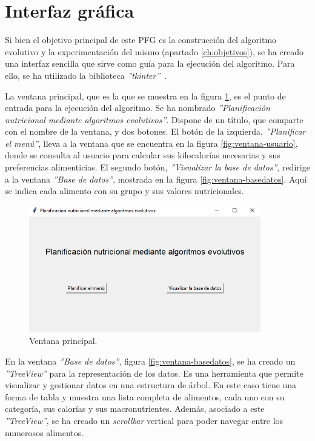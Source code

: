 \section{Interfaz gráfica}
\label{ch:interfaz-grafica}

Si bien el objetivo principal de este PFG es la construcción del algoritmo evolutivo y la experimentación del mismo (apartado \ref{ch:objetivos}), se ha creado una interfaz sencilla que sirve como guía para la ejecución del algoritmo. Para ello, se ha utilizado la biblioteca \textit{''tkinter''}~\cite{python_tkinter}.

La ventana principal, que es la que se muestra en la figura \ref{fig:ventana-main}, es el punto de entrada para la ejecución del algoritmo. Se ha nombrado \textit{''Planificación nutricional mediante algoritmos evolutivos''}. Dispone de un título, que comparte con el nombre de la ventana, y dos botones. El botón de la izquierda, \textit{''Planificar el menú''}, lleva a la ventana que se encuentra en la figura \ref{fig:ventana-usuario}, donde se consulta al usuario para calcular sus kilocalorías necesarias y sus preferencias alimenticias. El segundo botón, \textit{''Visualizar la base de datos''}, redirige a la ventana \textit{''Base de datos''}, mostrada en la figura \ref{fig:ventana-basedatos}. Aquí se indica cada alimento con su grupo y sus valores nutricionales.

\begin{figure}[H]
    \centering
    \includegraphics[width=0.9\textwidth]{figures/ventana-main.png}
    \caption{Ventana principal.}
    \label{fig:ventana-main}
\end{figure}

En la ventana \textit{''Base de datos''}, figura \ref{fig:ventana-basedatos}, se ha creado un \textit{''TreeView''} para la representación de los datos. Es una herramienta que permite visualizar y gestionar datos en una estructura de árbol. En este caso tiene una forma de tabla y muestra una lista completa de alimentos, cada uno con su categoría, sus calorías y sus macronutrientes. Además, asociado a este \textit{''TreeView''}, se ha creado un \textit{scrollbar} vertical para poder navegar entre los numerosos alimentos.

